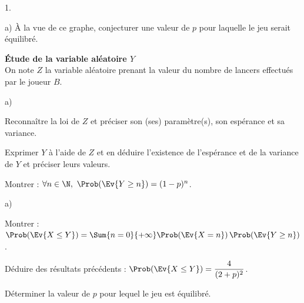 \begin{noliste}{1.}
\begin{noliste}{a)}
    À la vue de ce graphe, conjecturer une valeur de $p$ pour laquelle 
    le jeu serait équilibré.
    
    
    
  \end{noliste}
  
  \item {\bf Étude de la variable aléatoire $Y$}\\[.1cm]
  On note $Z$ la variable aléatoire prenant la valeur du nombre de 
  lancers effectués par le joueur $B$.
  \begin{noliste}{a)}
    \setlength{\itemsep}{2mm}
    \item Reconnaître la loi de $Z$ et préciser son (ses) paramètre(s), 
    son espérance et sa variance.
    
    

    
    \item Exprimer $Y$ à l'aide de $Z$ et en déduire l'existence de 
    l'espérance et de la variance de $Y$ et préciser leurs valeurs.
    
    
    
    

    
    \item Montrer : $\forall n \in \N, \ \Prob(\Ev{Y \geq n}) = 
    (1-p)^n$.
    
    
  \end{noliste}
  
  
  
  
  \item 
  \begin{noliste}{a)}
    \setlength{\itemsep}{2mm}
  \item Montrer : $\Prob(\Ev{X \leq Y}) = \Sum{n=0}{+\infty}
    \Prob(\Ev{X=n}) \, \Prob(\Ev{Y \geq n})$.
    
    
    
  \item Déduire des résultats précédents : $\Prob(\Ev{X \leq Y}) =
    \dfrac{4}{(2+p)^2}$.
    
    

    
    \item Déterminer la valeur de $p$ pour lequel le jeu est équilibré.
    
    
  \end{noliste}
\end{noliste}






